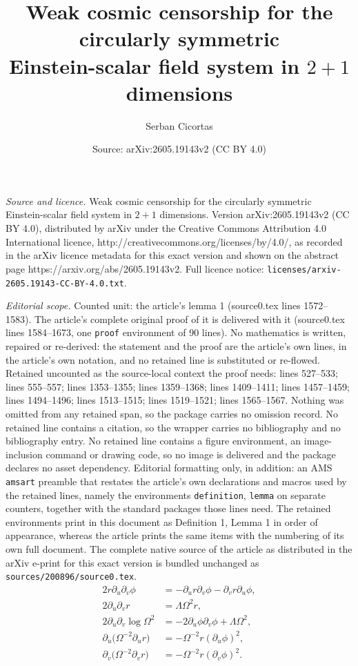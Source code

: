 \documentclass[10pt,a4paper]{amsart}
\title{Weak cosmic censorship for the circularly symmetric \\ Einstein-scalar field system in $2+1$ dimensions}
\author{Serban Cicortas}
\date{Source: arXiv:2605.19143v2 (CC BY 4.0)}
\begin{document}
\maketitle

\noindent\emph{Source and licence.} Weak cosmic censorship for the circularly symmetric \\ Einstein-scalar field system in $2+1$ dimensions. Version arXiv:2605.19143v2 (CC BY 4.0), distributed by arXiv under the Creative Commons Attribution 4.0 International licence, http://creativecommons.org/licenses/by/4.0/, as recorded in the arXiv licence metadata for this exact version and shown on the abstract page https://arxiv.org/abs/2605.19143v2. Full licence notice: \texttt{licenses/arxiv-2605.19143-CC-BY-4.0.txt}.\par\smallskip

\noindent\textit{Editorial scope.} Counted unit: the article's lemma 1 (source0.tex lines 1572--1583). The article's complete original proof of it is delivered with it (source0.tex lines 1584--1673, one \texttt{proof} environment of 90 lines). No mathematics is written, repaired or re-derived: the statement and the proof are the article's own lines, in the article's own notation, and no retained line is substituted or re-flowed.  Retained uncounted as the source-local context the proof needs: lines 527--533; lines 555--557; lines 1353--1355; lines 1359--1368; lines 1409--1411; lines 1457--1459; lines 1494--1496; lines 1513--1515; lines 1519--1521; lines 1565--1567.  Nothing was omitted from any retained span, so the package carries no omission record.  No retained line contains a citation, so the wrapper carries no bibliography and no bibliography entry.  No retained line contains a figure environment, an image-inclusion command or drawing code, so no image is delivered and the package declares no asset dependency.  Editorial formatting only, in addition: an AMS \texttt{amsart} preamble that restates the article's own declarations and macros used by the retained lines, namely the environments \texttt{definition}, \texttt{lemma} on separate counters, together with the standard packages those lines need.  The retained environments print in this document as Definition 1, Lemma 1 in order of appearance, whereas the article prints the same items with the numbering of its own full document.  The complete native source of the article as distributed in the arXiv e-print for this exact version is bundled unchanged as \texttt{sources/200896/source0.tex}.
\begin{align}
    2r\partial_u\partial_v\phi&=-\partial_ur\partial_v\phi-\partial_vr\partial_u\phi,\label{wave equation phi}\\
    2\partial_u\partial_vr&=\Lambda\Omega^2r,\label{wave equation r}\\
    2\partial_u\partial_v\log\Omega^{2}&=-2\partial_u\phi\partial_v\phi+\Lambda\Omega^2,\label{wave equation Omega}\\
    \partial_u\big(\Omega^{-2}\partial_ur\big)&=-\Omega^{-2}r(\partial_u\phi)^2,\label{Ray u}\\
    \partial_v\big(\Omega^{-2}\partial_vr\big)&=-\Omega^{-2}r(\partial_v\phi)^2\label{Ray v}.
\end{align}
\end{document}
